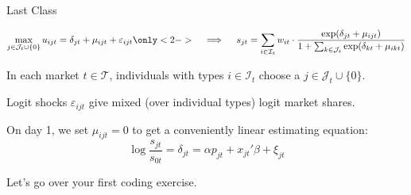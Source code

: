 \documentclass[aspectratio=169,t,11pt,table]{beamer}
\begin{document}

\begin{frame}{Last Class}
    \vspace{-\baselineskip}
    \begin{minipage}[c][4\baselineskip][c]{\textwidth}
        \begin{equation*}
            \max_{j \in \mathcal{J}_t \cup \{0\}} u_{ijt} = \delta_{jt} + \mu_{ijt} + \varepsilon_{ijt} \only<2->{\quad\implies\quad s_{jt} = \sum_{i \in \mathcal{I}_t} w_{it} \cdot \frac{\exp(\delta_{jt} + \mu_{ijt})}{1 + \sum_{k \in \mathcal{J}_t} \exp(\delta_{kt} + \mu_{ikt})}} 
        \end{equation*}
    \end{minipage}
    \vspace{-0.5\baselineskip}
    \begin{wideitemize}
        \item In each market $t \in \mathcal{T}$, individuals with types $i \in \mathcal{I}_t$ choose a $j \in \mathcal{J}_t \cup\{0\}$.
        \pause
        \item Logit shocks $\varepsilon_{ijt}$ give mixed (over individual types) logit market shares.
        \pause
        \item On day 1, we set $\mu_{ijt} = 0$ to get a conveniently linear estimating equation:
        \begin{equation*}
            \log\frac{s_{jt}}{s_{0t}} = \delta_{jt} = \alpha p_{jt} + x_{jt}'\beta + \xi_{jt}
        \end{equation*}
        \vspace{-\baselineskip}
        \pause
        \item Let's go over your first coding exercise.
    \end{wideitemize}
\end{frame}
\end{document}

